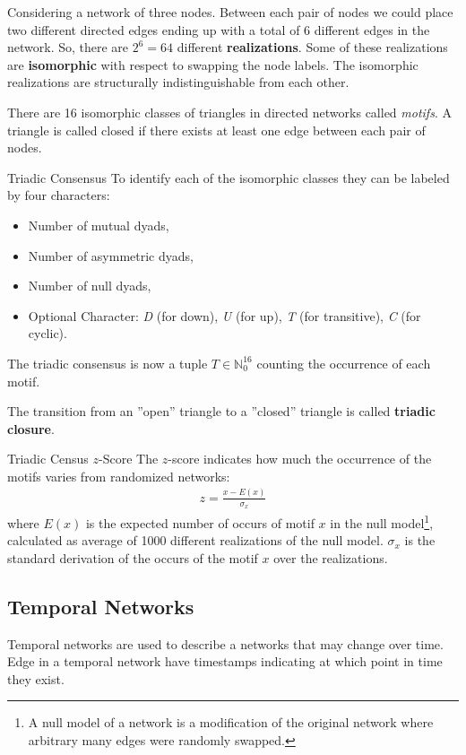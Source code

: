 \documentclass[english]{panikzettel}
\begin{document}
Considering a network of three nodes.
Between each pair of nodes we could place two different directed edges ending up with a total of 6 different edges in the network.
So, there are $ 2^6 = 64 $ different \textbf{realizations}.
Some of these realizations are \textbf{isomorphic} with respect to swapping the node labels.
The isomorphic realizations are structurally indistinguishable from each other.

There are 16 isomorphic classes of triangles in directed networks called \textit{motifs}.
A triangle is called closed if there exists at least one edge between each pair of nodes.

\begin{defi}{Triadic Consensus}
To identify each of the isomorphic classes they can be labeled by four characters:
\begin{itemize}
	\item Number of mutual dyads,
	\item Number of asymmetric dyads,
	\item Number of null dyads,
	\item Optional Character: \textit{D} (for down), \textit{U} (for up), \textit{T} (for transitive), \textit{C} (for cyclic).
\end{itemize}
The triadic consensus is now a tuple $ T \in \mathbb{N}_0^{16} $ counting the occurrence of each motif.
\end{defi}

The transition from an ''open'' triangle to a ''closed'' triangle is called \textbf{triadic closure}.

\begin{defi}{Triadic Census $ z $-Score}
The $ z $-score indicates how much the occurrence of the motifs varies from randomized networks:
\begin{align*}
	z = \frac{x - E(x)}{\sigma_x}
\end{align*}
where $ E(x) $ is the expected number of occurs of motif $ x $ in the null model\footnote{A null model of a network is a modification of the original network where arbitrary many edges were randomly swapped.}, calculated as average of 1000 different realizations of the null model.
$ \sigma_x $ is the standard derivation of the occurs of the motif $ x $ over the realizations.
\end{defi}

\subsection{Temporal Networks}
Temporal networks are used to describe a networks that may change over time.
Edge in a temporal network have timestamps indicating at which point in time they exist.
\end{document}
